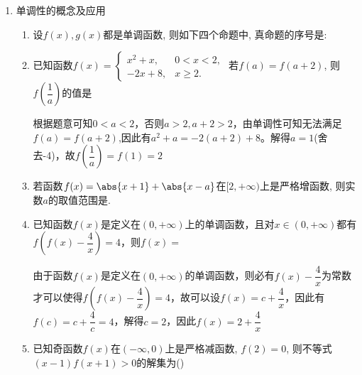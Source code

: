 \begin{enumerate}
\item 单调性的概念及应用
\begin{enumerate}
    \item 设$f(x), g(x)$都是单调函数, 则如下四个命题中, 真命题的序号是: 
    \item 已知函数$f(x) = \left\{  
     \begin{array}{ll}  
        x^2+x, & 0 < x < 2, \\  
        -2x+8, & x \geq 2.
     \end{array}
     \right.$ 若$f(a) = f(a+2)$, 则$f\left(\dfrac{1}{a}\right)$的值是
     \begin{jieda}
         根据题意可知$0 < a < 2$，否则$a > 2, a+2 > 2$，由单调性可知无法满足$f(a) = f(a+2)$,因此有$a^2 + a = -2(a+2)+8$。解得$a = 1$(舍去-4)，故$f(\dfrac{1}{a}) = f(1) = 2$
     \end{jieda}
     \item 若函数$f(x)=\abs{x+1}+\abs{x-a}$在$[2,+\infty)$上是严格增函数, 则实数$a$的取值范围是.
     \item 已知函数$f(x)$是定义在$(0, +\infty)$上的单调函数，且对$x \in (0, +\infty)$都有$f\left(f(x) - \dfrac{4}{x}\right) = 4$，则$f(x) = $
     \begin{jieda}
        由于函数$f(x)$是定义在$(0, +\infty)$的单调函数，则必有$f(x) - \dfrac{4}{x}$为常数才可以使得$f(f(x) - \dfrac{4}{x}) = 4$，故可以设$f(x) = c + \dfrac{4}{x}$，因此有$f(c) = c + \dfrac{4}{c} = 4$，解得$c = 2$，因此$f(x) = 2+\dfrac{4}{x}$
     \end{jieda}
     \item 已知奇函数$f(x)$在$(-\infty,0)$上是严格减函数, $f(2)=0$, 则不等式$(x-1)f(x+1)>0$的解集为\dotfill()
\end{enumerate}


\end{enumerate}
